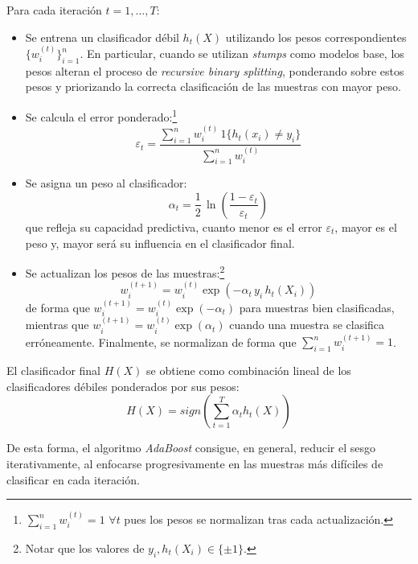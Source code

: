 \documentclass[titlepage, 11pt]{book}
\begin{document}
Para cada iteración $t=1,\ldots,T$:
\begin{itemize}
    \item Se entrena un clasificador débil $h_t(X)$ utilizando los pesos correspondientes $\{w_i^{(t)}\}^n_{i=1}$. En particular, cuando se utilizan \textit{stumps} como modelos base, los pesos alteran el proceso de \textit{recursive binary splitting}, ponderando sobre estos pesos y priorizando la correcta clasificación de las muestras con mayor peso.

    \item Se calcula el error ponderado:\footnote{$\sum^n_{i=1}w_i^{(t)}=1$ $\forall t$ pues los pesos se normalizan tras cada actualización.}
        \begin{equation*}
            \varepsilon_t=\frac{\sum^n_{i=1}w_i^{(t)}\,1\{h_t(x_i) \neq y_i\}}{\sum^n_{i=1}w_i^{(t)}}
        \end{equation*}

    \item Se asigna un peso al clasificador:
        \begin{equation*}
            \alpha_t=\frac{1}{2}\,\ln \left( \frac{1-\varepsilon_t}{\varepsilon_t} \right)
        \end{equation*}
        que refleja su capacidad predictiva, cuanto menor es el error $\varepsilon_t$, mayor es el peso y, mayor será su influencia en el clasificador final.

    \item Se actualizan los pesos de las muestras:\footnote{Notar que los valores de $y_i,h_t(X_i) \in \{\pm 1 \}$.}
        \begin{equation*}
            w_i^{(t+1)}=w_i^{(t)}\exp \left( -\alpha_t\,y_i\,h_t(X_i)\right)
        \end{equation*}
        de forma que $ w_i^{(t+1)}=w_i^{(t)}\exp \left( -\alpha_t \right)$ para muestras bien clasificadas, mientras que $ w_i^{(t+1)}=w_i^{(t)}\exp \left( \alpha_t \right)$ cuando una muestra se clasifica erróneamente. Finalmente, se normalizan de forma que $\sum_{i=1}^n w_i^{(t+1)} = 1$.
\end{itemize}

El clasificador final $H(X)$ se obtiene como combinación lineal de los clasificadores débiles ponderados por sus pesos:
\begin{equation*}
    H(X)=sign \left( \sum_{t=1}^T \alpha_t h_t(X) \right)
\end{equation*}

De esta forma, el algoritmo \textit{AdaBoost} consigue, en general, reducir el sesgo iterativamente, al enfocarse progresivamente en las muestras más difíciles de clasificar en cada iteración.
\end{document}
